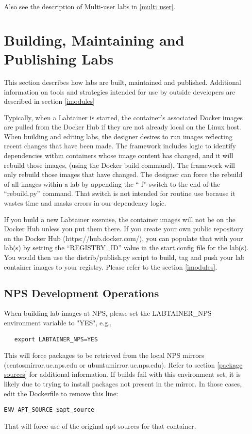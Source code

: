\documentclass[12pt]{article}
\begin{document}
Also see the description of Multi-user labs in \ref{multi user}.

\section{Building, Maintaining and Publishing Labs} \label{publishing}
This section describes how labs are built, maintained and published.  Additional information
on tools and strategies intended for use by outside developers are described in section \ref{imodules}

Typically, when a Labtainer is started, the container's associated Docker images are pulled from
the Docker Hub if they are not already local on the Linux host.  When building and editing labs,
the designer desires to run images reflecting recent changes that have been made.  The framework
includes logic to identify dependencies within containers whose image content has changed, 
and it will rebuild those images, (using the Docker build command).  The framework will only 
rebuild those images that have changed.  The designer can force the rebuild of all images within
a lab by appending the ``-f'' switch to the end of the ``rebuild.py'' command.  That switch is not
intended for routine use because it wastes time and masks errors in our dependency logic.

If you build a new Labtainer exercise, the container images will not be on the Docker Hub unless you put
them there.  If you
create your own public repository on the Docker Hub (https://hub.docker.com/), you can populate that
with your lab(s) by setting the ``REGISTRY\_ID'' value in the start.config file for the lab(s). You
would then use the distrib/publish.py script to build, tag and push your lab container images to your registry.
Please refer to the section \ref{imodules}.

\subsection{NPS Development Operations}
When building lab images at NPS, please set the LABTAINER\_NPS environment variable to "YES", e.g.,
\begin{verbatim}
   export LABTAINER_NPS=YES
\end{verbatim}
This will force packages to be retrieved from the local NPS mirrors (centosmirror.uc.nps.edu or
ubuntumirror.uc.nps.edu).  Refer to section \ref{package sources} for additional information.
If builds fail with this environment set, it is likely due to trying to install packages not present
in the mirror.  In those cases, edit the Dockerfile to remove this line:
\begin{verbatim}
ENV APT_SOURCE $apt_source
\end{verbatim}
\noindent That will force use of the original apt-sources for that container.
\end{document}
